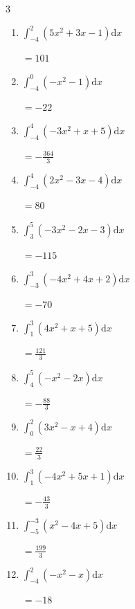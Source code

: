 \begin{multicols}{3}
\begin{enumerate}
  \item $\displaystyle \int_{-4}^{2}\left( 5x^{2}+3x-1 \right) \mathrm{d}x$

        $\displaystyle =101$

  \item $\displaystyle \int_{-4}^{0}\left( -x^{2}-1 \right) \mathrm{d}x$

        $\displaystyle =-22$

\columnbreak %

  \item $\displaystyle \int_{-4}^{4}\left( -3x^{2}+x+5 \right) \mathrm{d}x$

        $\displaystyle =-\frac{364}{3}$

  \item $\displaystyle \int_{-4}^{4}\left( 2x^{2}-3x-4 \right) \mathrm{d}x$

        $\displaystyle =80$

  \item $\displaystyle \int_{3}^{5}\left( -3x^{2}-2x-3 \right) \mathrm{d}x$

        $\displaystyle =-115$

  \item $\displaystyle \int_{-3}^{3}\left( -4x^{2}+4x+2 \right) \mathrm{d}x$

        $\displaystyle =-70$

  \item $\displaystyle \int_{1}^{3}\left( 4x^{2}+x+5 \right) \mathrm{d}x$

        $\displaystyle =\frac{121}{3}$

\columnbreak %

  \item $\displaystyle \int_{4}^{5}\left( -x^{2}-2x \right) \mathrm{d}x$

        $\displaystyle =-\frac{88}{3}$

  \item $\displaystyle \int_{0}^{2}\left( 3x^{2}-x+4 \right) \mathrm{d}x$

        $\displaystyle =\frac{22}{3}$

  \item $\displaystyle \int_{1}^{3}\left( -4x^{2}+5x+1 \right) \mathrm{d}x$

        $\displaystyle =-\frac{43}{3}$

  \item $\displaystyle \int_{-5}^{-3}\left( x^{2}-4x+5 \right) \mathrm{d}x$

        $\displaystyle =\frac{199}{3}$

  \item $\displaystyle \int_{-4}^{2}\left( -x^{2}-x \right) \mathrm{d}x$

        $\displaystyle =-18$

\end{enumerate}
\end{multicols}
